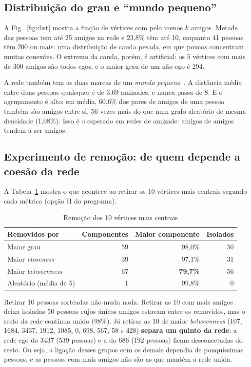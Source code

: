 \documentclass[conference]{IEEEtran}
\begin{document}
\subsection{Distribuição do grau e ``mundo pequeno''}

A Fig.~\ref{fig:dist} mostra a fração de vértices com pelo menos $k$ amigos. Metade das pessoas tem até 25 amigos na rede e 23,8\% têm até 10, enquanto 41 pessoas têm 200 ou mais: uma distribuição de cauda pesada, em que poucos concentram muitas conexões. O extremo da cauda, porém, é artificial: os 5 vértices com mais de 300 amigos são todos egos, e o maior grau de um não-ego é 294.

A rede também tem as duas marcas de um \emph{mundo pequeno}~\cite{watts1998}. A distância média entre duas pessoas quaisquer é de 3,69 amizades, e nunca passa de 8. E o agrupamento é alto: em média, 60,6\% dos pares de amigos de uma pessoa também são amigos entre si, 56 vezes mais do que num grafo aleatório de mesma densidade (1,08\%). Isso é o esperado em redes de amizade: amigos de amigos tendem a ser amigos.

\subsection{Experimento de remoção: de quem depende a coesão da rede}

A Tabela~\ref{tab:remocao} mostra o que acontece ao retirar os 10 vértices mais centrais segundo cada métrica (opção H do programa).

\begin{table}[htbp]
\caption{Remoção dos 10 vértices mais centrais}
\label{tab:remocao}
\centering
\setlength{\tabcolsep}{4pt}
\begin{tabular}{lrrr}
\toprule
Removidos por & Componentes & Maior componente & Isolados \\
\midrule
Maior grau & 59 & 98,0\% & 50 \\
Maior \textit{closeness} & 39 & 97,1\% & 31 \\
Maior \textit{betweenness} & 67 & \textbf{79,7\%} & 56 \\
Aleatório (média de 5) & 1 & 99,8\% & 0 \\
\bottomrule
\end{tabular}
\end{table}

Retirar 10 pessoas sorteadas não muda nada. Retirar as 10 com mais amigos deixa isoladas 50 pessoas cujos únicos amigos estavam entre os removidos, mas o resto da rede continua unido (98\%). Já retirar as 10 de maior \textit{betweenness} (107, 1684, 3437, 1912, 1085, 0, 698, 567, 58 e 428) \textbf{separa um quinto da rede}: a rede ego do 3437 (539 pessoas) e a do 686 (192 pessoas) ficam desconectadas do resto. Ou seja, a ligação desses grupos com os demais dependia de pouquíssimas pessoas, e as pessoas com mais amigos não são as que mantêm a rede unida.
\end{document}
